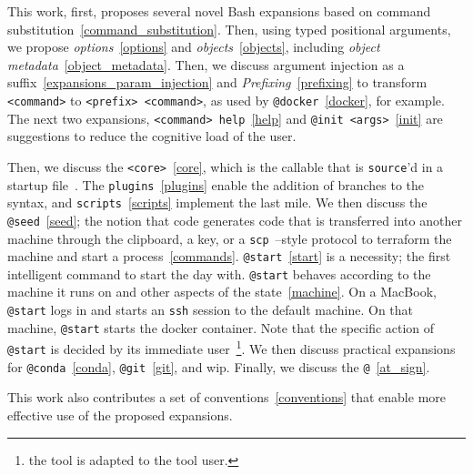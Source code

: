 This work, first, proposes several novel Bash expansions based on command substitution~\ref{command_substitution}. Then, using typed positional arguments, we propose \emph{options}~\ref{options} and \emph{objects}~\ref{objects}, including \emph{object metadata}~\ref{object_metadata}. Then, we discuss argument injection as a suffix~\ref{expansions_param_injection} and \emph{Prefixing}~\ref{prefixing} to transform \texttt{<command>} to \texttt{<prefix> <command>}, as used by \texttt{@docker}~\ref{docker}, for example. The next two expansions, \texttt{<command> help}~\ref{help} and \texttt{@init <args>}~\ref{init} are suggestions to reduce the cognitive load of the user.

Then, we discuss the \texttt{<core>}~\ref{core}, which is the callable that is \texttt{source}'d in a startup file~. The \texttt{plugins}~\ref{plugins} enable the addition of branches to the syntax, and \texttt{scripts}~\ref{scripts} implement the last mile. We then discuss the \texttt{@seed}~\ref{seed}; the notion that code generates code that is transferred into another machine through the clipboard, a key, or a \texttt{scp}~--style protocol to terraform the machine and start a process~\ref{commands}. \texttt{@start}~\ref{start} is a necessity; the first intelligent command to start the day with. \texttt{@start} behaves according to the machine it runs on and other aspects of the state~\ref{machine}. On a MacBook, \texttt{@start} logs in and starts an \texttt{ssh} session to the default machine. On that machine, \texttt{@start} starts the docker container. Note that the specific action of \texttt{@start} is decided by its immediate user~\footnote{the tool is adapted to the tool user.}. We then discuss practical expansions for \texttt{@conda}~\ref{conda}, \texttt{@git}~\ref{git}, and wip. Finally, we discuss the \texttt{@}~\ref{at_sign}.

This work also contributes a set of conventions~\ref{conventions} that enable more effective use of the proposed expansions.